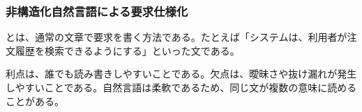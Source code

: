 \subsubsection{非構造化自然言語による要求仕様化}

とは、通常の文章で要求を書く方法である。たとえば「システムは、利用者が注文履歴を検索できるようにする」といった文である。

利点は、誰でも読み書きしやすいことである。欠点は、曖昧さや抜け漏れが発生しやすいことである。自然言語は柔軟であるため、同じ文が複数の意味に読めることがある。
